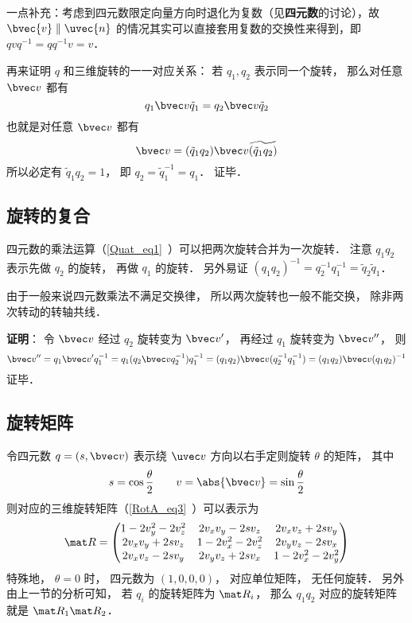 一点补充：考虑到四元数限定向量方向时退化为复数（见\textbf{四元数}的讨论），故 $\bvec{v}\parallel{\uvec{n}}$ 的情况其实可以直接套用复数的交换性来得到，即 $qvq^{-1}=qq^{-1}v=v$．

再来证明 $q$ 和三维旋转的一一对应关系： 若 $q_1,q_2$ 表示同一个旋转， 那么对任意 $\bvec v$ 都有
\begin{equation}
q_1\bvec v \tilde q_1 = q_2\bvec v \tilde q_2
\end{equation}
也就是对任意 $\bvec v$ 都有
\begin{equation}
\bvec v = (\tilde q_1q_2)\bvec v \widetilde{(\tilde q_1q_2)}
\end{equation}
所以必定有 $\tilde q_1q_2 = 1$， 即 $q_2 = \tilde q_1^{-1} = q_1$． 证毕．

\subsection{旋转的复合}
四元数的乘法运算（\autoref{Quat_eq1}~）可以把两次旋转合并为一次旋转． 注意 $q_1q_2$ 表示先做 $q_2$ 的旋转， 再做 $q_1$ 的旋转． 另外易证 $(q_1q_2)^{-1} = q_2^{-1} q_1^{-1} = \tilde q_2\tilde q_1$．

由于一般来说四元数乘法不满足交换律， 所以两次旋转也一般不能交换， 除非两次转动的转轴共线．

\textbf{证明}： 令 $\bvec v$ 经过 $q_2$ 旋转变为 $\bvec v'$， 再经过 $q_1$ 旋转变为 $\bvec v''$， 则
\begin{equation}
\bvec v'' = q_1\bvec v'q_1^{-1} = q_1(q_2\bvec vq_2^{-1}) q_1^{-1} = (q_1q_2)\bvec v(q_2^{-1} q_1^{-1}) = (q_1q_2)\bvec v(q_1q_2)^{-1}
\end{equation}
证毕．

\subsection{旋转矩阵}
令四元数 $q = (s, \bvec v)$ 表示绕 $\uvec v$ 方向以右手定则旋转 $\theta$ 的矩阵， 其中
\begin{equation}
s = \cos\frac{\theta}{2} \qquad
v = \abs{\bvec v} = \sin\frac{\theta}{2}
\end{equation}
则对应的三维旋转矩阵（\autoref{RotA_eq3}~）可以表示为
\begin{equation}\label{QuatN_eq2}
\mat R =
\begin{pmatrix}
1 - 2v_y^2 - 2v_z^2 & 2v_xv_y - 2sv_z  & 2v_x v_z + 2s v_y\\
2v_x v_y + 2sv_z & 1 - 2v_x^2 - 2v_z^2 & 2v_y v_z - 2s v_x\\
2v_x v_z - 2s v_y & 2v_y v_z + 2s v_x & 1 - 2v_x^2 - 2v_y^2
\end{pmatrix}
\end{equation}
特殊地， $\theta = 0$ 时， 四元数为 $(1,0,0,0)$， 对应单位矩阵， 无任何旋转． 另外由上一节的分析可知， 若 $q_i$ 的旋转矩阵为 $\mat R_i$， 那么 $q_1q_2$ 对应的旋转矩阵就是 $\mat R_1\mat R_2$．

